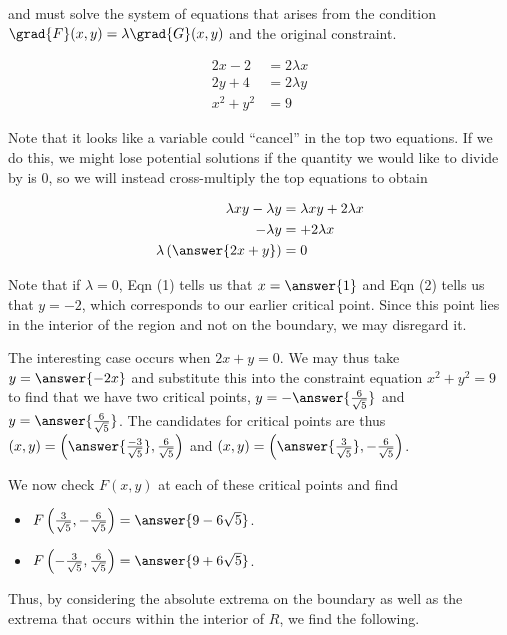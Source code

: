 \documentclass{ximera}
\begin{document}
\begin{exercise}
\begin{exercise}
\begin{exercise}
and must solve the system of equations that arises from the condition $\grad{F}(x,y) = \lambda \grad{G}(x,y)$ and the original constraint.

\begin{align}
2x-2 & = 2\lambda x \\
2y+4 & = 2\lambda y \\
x^2+y^2 &= 9
\end{align}

Note that it looks like a variable could ``cancel'' in the top two equations. If we do this, we might lose potential solutions if the quantity we would like to divide by is $0$, so we will instead cross-multiply the top equations to obtain

\begin{align*}
\lambda xy-\lambda y &= \lambda xy+2\lambda x \\
-\lambda y &=+2\lambda x \\
\lambda \left( \answer{2x+y} \right) &= 0 
\end{align*}


Note that if $\lambda = 0$, Eqn (1) tells us that $x=\answer{1}$ and Eqn (2) tells us that $y=-2$, which corresponds to our earlier critical point.  Since this point lies in the interior of the region and not on the boundary, we may disregard it.

The interesting case occurs when $2x+y= 0$.  We may thus take $y = \answer{-2x}$ and substitute this into the constraint equation $x^2+y^2 = 9$ to find that we have two critical points,  $y= -\answer{\frac{6}{\sqrt{5}}}$ and $y= \answer{\frac{6}{\sqrt{5}}}$.  The candidates for critical points are thus $(x,y) = \left(  \answer{\frac{-3}{\sqrt{5}}}, \frac{6}{\sqrt{5}}\right)$ and $(x,y) = \left(  \answer{\frac{3}{\sqrt{5}}}, -\frac{6}{\sqrt{5}}\right)$.

\begin{exercise}
We now check $F(x,y)$ at each of these critical points and find

\begin{itemize}
\item $F\left(\frac{3}{\sqrt{5}}, - \frac{6}{\sqrt{5}} \right) = \answer{9-6 \sqrt{5}}$.
\item $F\left(-\frac{3}{\sqrt{5}},  \frac{6}{\sqrt{5}} \right) = \answer{9+6 \sqrt{5}}$.
\end{itemize}

\end{exercise}

Thus, by considering the absolute extrema on the boundary as well as the extrema that occurs within the interior of $R$, we find the following.


\end{exercise}
\end{exercise}
\end{exercise}
\end{document}
